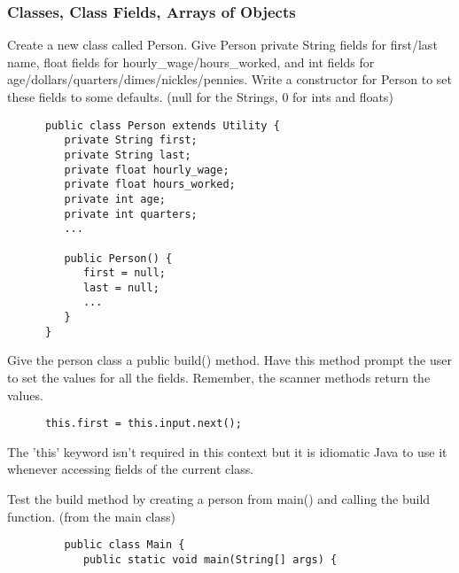 \documentclass[../../main.tex]{subfiles}
\begin{document}
\subsubsection{Classes, Class Fields, Arrays of Objects}
\begin{steps}
      \item Create a new class called Person. Give Person private String fields for first/last 
         name, float fields for hourly_wage/hours_worked, and
         int fields for age/dollars/quarters/dimes/nickles/pennies. Write a constructor for
         Person to set these fields to some defaults.
         (null for the Strings, 0 for ints and floats)
      \begin{verbatim}
      public class Person extends Utility {
         private String first;
         private String last;
         private float hourly_wage;
         private float hours_worked;
         private int age;
         private int quarters;
         ...

         public Person() {
            first = null;
            last = null;
            ...
         }
      }
      \end{verbatim}

      \item Give the person class a public build() method. Have this method prompt the user
         to set the values for all the fields. Remember, the scanner methods return the values.
      \begin{verbatim}
      this.first = this.input.next();
      \end{verbatim}
         The 'this' keyword isn't required in this context but it is idiomatic Java to use it
         whenever accessing fields of the current class.
      \item Test the build method by creating a person from main() and calling the build
         function. (from the main class)
      \begin{verbatim}
         public class Main {
            public static void main(String[] args) {
      \end{verbatim}
      \vspace{.5cm}
      \underline{\hspace{15cm}}\\
      \vspace{.5cm}\\
      \underline{\hspace{15cm}}


\end{steps}
\end{document}

